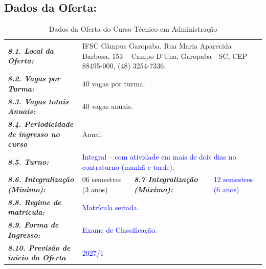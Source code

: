 \documentclass{../../modelos/latex-shared/ifsc-ppc}
\newcommand{\revisao}[1]{\textcolor{blue}{#1}}
\newcommand{\revisao}[1]{#1}
\begin{document}
\vspace{0.3cm}

\subsection{Dados da Oferta:}

\begin{table}[H]
\centering
\small
\caption{Dados da Oferta do Curso Técnico em Administração}
\label{qua:dados-oferta}
\vspace{0.2cm}
\begin{tabularx}{\linewidth}{|p{4.4cm}|X|p{3.8cm}|X|}
\hline
\rowcolor{cinzaTabela}
\multicolumn{4}{|l|}{\textcolor{ifscgreen}{\textbf{\large 8. Dados da Oferta:}}} \\ \hline
\textcolor{ifscgreen}{\textbf{\textit{8.1. Local da Oferta:}}} & \multicolumn{3}{p{\dimexpr\linewidth-4.4cm-4\tabcolsep-3\arrayrulewidth\relax}|}{IFSC Câmpus Garopaba. Rua Maria Aparecida Barbosa, 153 -- Campo D'Una, Garopaba - SC, CEP 88495-000, (48) 3254-7336.} \\ \hline
\textcolor{ifscgreen}{\textbf{\textit{8.2. Vagas por Turma:}}} & \multicolumn{3}{p{\dimexpr\linewidth-4.4cm-4\tabcolsep-3\arrayrulewidth\relax}|}{40 vagas por turma.} \\ \hline
\textcolor{ifscgreen}{\textbf{\textit{8.3. Vagas totais Anuais:}}} & \multicolumn{3}{p{\dimexpr\linewidth-4.4cm-4\tabcolsep-3\arrayrulewidth\relax}|}{40 vagas anuais.} \\ \hline
\textcolor{ifscgreen}{\textbf{\textit{8.4. Periodicidade de ingresso no curso}}} & \multicolumn{3}{p{\dimexpr\linewidth-4.4cm-4\tabcolsep-3\arrayrulewidth\relax}|}{Anual.} \\ \hline
\textcolor{ifscgreen}{\textbf{\textit{8.5. Turno:}}} & \multicolumn{3}{p{\dimexpr\linewidth-4.4cm-4\tabcolsep-3\arrayrulewidth\relax}|}{\revisao{Integral -- com atividade em mais de dois dias no contraturno (manhã e tarde).}} \\ \hline
\textcolor{ifscgreen}{\textbf{\textit{8.6. Integralização (Mínimo):}}} & 06 semestres (3 anos) & \textcolor{ifscgreen}{\textbf{\textit{8.7 Integralização (Máximo):}}} & \revisao{12 semestres (6 anos)} \\ \hline
\textcolor{ifscgreen}{\textbf{\textit{8.8. Regime de matrícula:}}} & \multicolumn{3}{p{\dimexpr\linewidth-4.4cm-4\tabcolsep-3\arrayrulewidth\relax}|}{\revisao{Matrícula seriada.}} \\ \hline
\textcolor{ifscgreen}{\textbf{\textit{8.9. Forma de Ingresso:}}} & \multicolumn{3}{p{\dimexpr\linewidth-4.4cm-4\tabcolsep-3\arrayrulewidth\relax}|}{\revisao{Exame de Classificação.}} \\ \hline
\textcolor{ifscgreen}{\textbf{\textit{8.10. Previsão de início da Oferta}}} & \multicolumn{3}{p{\dimexpr\linewidth-4.4cm-4\tabcolsep-3\arrayrulewidth\relax}|}{\revisao{2027/1}} \\ \hline
\end{tabularx}
\end{table}
\end{document}
